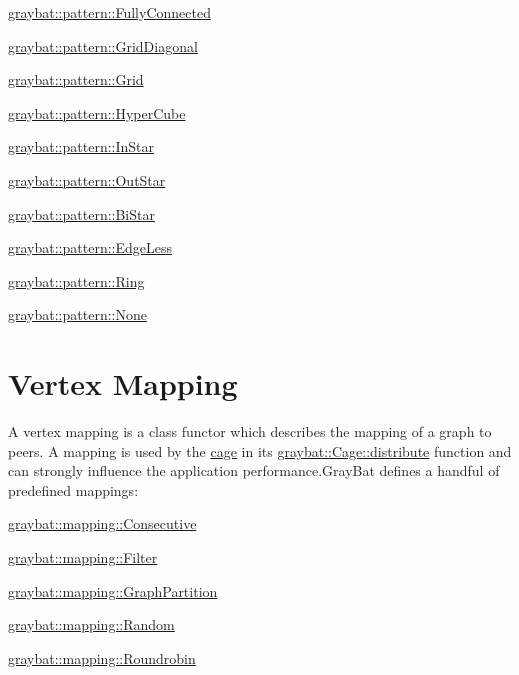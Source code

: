 \begin{DoxyItemize}
\item \hyperlink{structgraybat_1_1pattern_1_1FullyConnected}{graybat\+::pattern\+::\+Fully\+Connected}
\item \hyperlink{structgraybat_1_1pattern_1_1GridDiagonal}{graybat\+::pattern\+::\+Grid\+Diagonal}
\item \hyperlink{structgraybat_1_1pattern_1_1Grid}{graybat\+::pattern\+::\+Grid}
\item \hyperlink{structgraybat_1_1pattern_1_1HyperCube}{graybat\+::pattern\+::\+Hyper\+Cube}
\item \hyperlink{structgraybat_1_1pattern_1_1InStar}{graybat\+::pattern\+::\+In\+Star}
\item \hyperlink{structgraybat_1_1pattern_1_1OutStar}{graybat\+::pattern\+::\+Out\+Star}
\item \hyperlink{structgraybat_1_1pattern_1_1BiStar}{graybat\+::pattern\+::\+Bi\+Star}
\item \hyperlink{structgraybat_1_1pattern_1_1EdgeLess}{graybat\+::pattern\+::\+Edge\+Less}
\item \hyperlink{structgraybat_1_1pattern_1_1Ring}{graybat\+::pattern\+::\+Ring}
\item \hyperlink{structgraybat_1_1pattern_1_1None}{graybat\+::pattern\+::\+None} 
\end{DoxyItemize}\hypertarget{mapping}{}\section{Vertex Mapping}\label{mapping}
A vertex mapping is a class functor which describes the mapping of a graph to peers. A mapping is used by the \hyperlink{cage}{cage} in its \hyperlink{structgraybat_1_1Cage_afeddcc035e25382462c38c77b481304d}{graybat\+::\+Cage\+::distribute} function and can strongly influence the application performance.\+Gray\+Bat defines a handful of predefined mappings\+:


\begin{DoxyItemize}
\item \hyperlink{structgraybat_1_1mapping_1_1Consecutive}{graybat\+::mapping\+::\+Consecutive}
\item \hyperlink{structgraybat_1_1mapping_1_1Filter}{graybat\+::mapping\+::\+Filter}
\item \hyperlink{structgraybat_1_1mapping_1_1GraphPartition}{graybat\+::mapping\+::\+Graph\+Partition}
\item \hyperlink{structgraybat_1_1mapping_1_1Random}{graybat\+::mapping\+::\+Random}
\item \hyperlink{structgraybat_1_1mapping_1_1Roundrobin}{graybat\+::mapping\+::\+Roundrobin}
\end{DoxyItemize}

